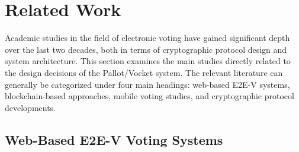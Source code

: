\documentclass[a4paper,fleqn]{cas-sc}
\begin{document}
\section{Related Work}
\label{sec:relatedwork}


Academic studies in the field of electronic voting have gained significant depth over the last two decades, both in terms of cryptographic protocol design and system architecture. This section examines the main studies directly related to the design decisions of the Pallot/Vocket system. The relevant literature can generally be categorized under four main headings: web-based E2E-V systems, blockchain-based approaches, mobile voting studies, and cryptographic protocol developments.

\subsection{Web-Based E2E-V Voting Systems}

\end{document}
